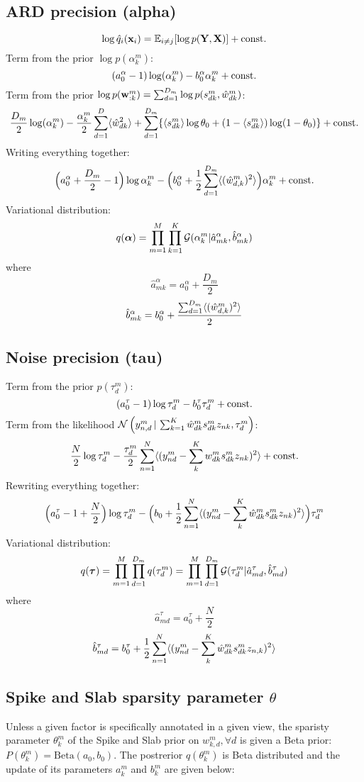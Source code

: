 \documentclass[10pt, a4paper,openany]{report}
\begin{document}
\subsection*{ARD precision (alpha)}
\begin{equation} \label{eq:optimal_q_dist}
\log \hat{q}_i({\bf x}_i) = \mathbb{E}_{i \neq j} [\log p({\bf Y},{\bf X})] + {\rm const.}
\end{equation}
Term from the prior $\log p(\alpha_k^m)$:
\[
(a_0^\alpha-1) \log(\alpha_k^m) - b_0^{\alpha}\alpha_k^m + {\rm const.}
\]
Term from the prior $\log p({\bf w}_{:k}^m) = \sum_{d=1}^{D_m} \log p(s_{dk}^m,\hat{w}_{dk}^m)$:
\[
\frac{D_m}{2}\log(\alpha_k^m) -\frac{\alpha_k^m}{2}\sum_{d=1}^{D} \langle \hat{w}_{dk}^2 \rangle + \sum_{d=1}^{D_m} \{ \langle s_{dk}^m \rangle \log\theta_0 + (1-\langle s_{dk}^m \rangle) \log(1-\theta_0)  \} + {\rm const.}
\]
Writing everything together:
\[
\Big(a_0^{\alpha} + \frac{D_m}{2} - 1 \Big)\log\alpha_k^m - \Big(b_0^{\alpha} + \frac{1}{2} \sum_{d=1}^{D_m}\langle (\hat{w}_{d,k}^m)^2 \rangle \Big) \alpha_k^m + {\rm const.}
\]
Variational distribution:
\[
q(\mbox{\boldmath $\alpha$}) = \prod_{m=1}^{M} \prod_{k=1}^{K} \mathcal{G}(\alpha_k^m | \hat{a}_{mk}^{\alpha}, \hat{b}_{mk}^{\alpha})
\]
where
\[
\hat{a}_{mk}^\alpha = a_0^\alpha + \frac{D_m}{2}
\]
\[
\hat{b}_{mk}^\alpha = b_0^\alpha +\frac{ \sum_{d=1}^{D_m} \langle (\hat{w}_{d,k}^m)^2 \rangle }{2}
\]

\subsection*{Noise precision (tau)}
Term from the prior $p(\tau_d^m)$:
\[
(a_0^\tau - 1) \log \tau_d^m - b_0^\tau \tau_d^m + {\rm const.}
\]
Term from the likelihood $\mathcal{N}\left(y_{n,d}^m \,|\, \sum_{k=1}^{K}\hat{w}_{dk}^m s_{dk}^m z_{nk},\tau_d^m\right)$:
\[
\frac{N}{2}\log \tau_d^m - \frac{\tau_d^m}{2} \sum_{n=1}^{N} \langle (y_{nd}^m - \sum_k^{K} w_{dk}^m s_{dk}^m z_{nk})^2 \rangle + {\rm const.}
\]
Rewriting everything together:
\[
\Big(a_0^\tau - 1 + \frac{N}{2} \Big)\log \tau_d^m - \Big( b_0 + \frac{1}{2} \sum_{n=1}^{N} \langle (y_{nd}^m - \sum_k^{K} \hat{w}_{dk}^m s_{dk}^m z_{nk})^2 \rangle  \Big )\tau_d^m
\]
Variational distribution:
\[
q(\mbox{\boldmath $\tau$}) = \prod_{m=1}^{M} \prod_{d=1}^{D_m} q(\tau_d^m) = \prod_{m=1}^{M} \prod_{d=1}^{D_m} \mathcal{G}(\tau_d^m|\hat{a}_{md}^{\tau},\hat{b}_{md}^{\tau})
\]
where
\[
\hat{a}_{md}^{\tau} = a_0^{\tau} + \frac{N}{2}
\]
\[
\hat{b}_{md}^{\tau} = b_0^{\tau} + \frac{1}{2} \sum_{n=1}^{N} \langle (y_{nd}^m - \sum_k^{K} \hat{w}_{dk}^m s_{dk}^m z_{n,k})^2 \rangle
\]

\subsection*{Spike and Slab sparsity parameter $\theta$}
Unless a given factor is specifically annotated in a given view, the sparisty parameter $\theta^m_{k}$ of the Spike and Slab prior on $w_{k,d}^m, \forall d$ is given a Beta prior: $P(\theta_k^m) = \mathrm{Beta} (a_0, b_0)$. The postrerior $q(\theta_k^m)$ is Beta distributed and the update of its parameters $a_k^m$ and $b_k^m$ are given below:\\
\end{document}
